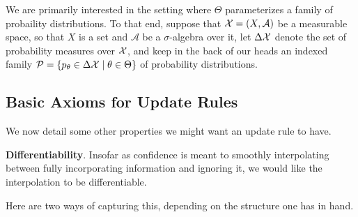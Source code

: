 \documentclass{article}
\begin{document}
%



We are primarily interested in the setting where $\Theta$ parameterizes a family of probaility distributions.
To that end, suppose that $\mathcal X = (X, \mathcal A)$ be a measurable space, so that $X$ is a set and $\mathcal A$ be a $\sigma$-algebra over it, let $\Delta \mathcal X$ denote the set of probability measures over $\mathcal X$,
and keep in the back of our heads an indexed family
$
    \mathcal P =
    \{ p_\theta \in\Delta\mathcal X \mid \theta \in \Theta \}
$ of probability distributions.

%



\subsection{Basic Axioms for Update Rules}

We now detail some other properties we might want an update rule to have.

\textbf{Differentiability}.
Insofar as confidence is meant to smoothly interpolating between fully incorporating information and ignoring it, we would like the interpolation to be differentiable.

Here are two ways of capturing this, depending on the structure one has in hand.
\end{document}

